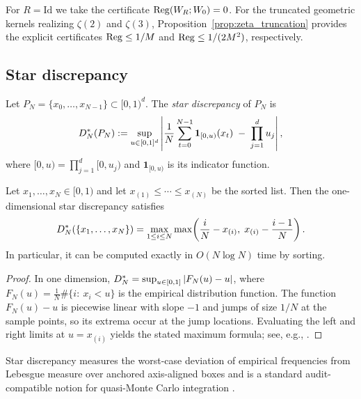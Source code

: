 \begin{remark}
For $R=\mathrm{Id}$ we take the certificate $\mathrm{Reg}(W_R;W_0)=0$.
For the truncated geometric kernels realizing $\zeta(2)$ and $\zeta(3)$, Proposition~\ref{prop:zeta_truncation} provides the explicit certificates $\mathrm{Reg}\le 1/M$ and $\mathrm{Reg}\le 1/(2M^2)$, respectively.
\end{remark}

\subsection{Star discrepancy}
\label{sec:star_discrepancy}

\begin{definition}
\label{def:star_discrepancy}
Let $P_N=\{x_0,\dots,x_{N-1}\}\subset[0,1)^d$.
The \emph{star discrepancy} of $P_N$ is
\[
D_N^\ast(P_N):=\sup_{u\in[0,1]^d}\left|
\frac{1}{N}\sum_{t=0}^{N-1}\mathbf{1}_{[0,u)}(x_t)\;-\;\prod_{j=1}^d u_j
\right|,
\]
where $[0,u)=\prod_{j=1}^d[0,u_j)$ and $\mathbf{1}_{[0,u)}$ is its indicator function.
\end{definition}

\begin{lemma}
\label{lem:star_discrepancy_1d_formula}
Let $x_1,\dots,x_N\in[0,1)$ and let $x_{(1)}\le \cdots \le x_{(N)}$ be the sorted list.
Then the one-dimensional star discrepancy satisfies
\[
D_N^\ast(\{x_1,\dots,x_N\})
=
\max_{1\le i\le N}\max\!\left(\frac{i}{N}-x_{(i)},\;x_{(i)}-\frac{i-1}{N}\right).
\]
In particular, it can be computed exactly in $O(N\log N)$ time by sorting.
\end{lemma}

\begin{proof}
In one dimension, $D_N^\ast=\sup_{u\in[0,1]}|F_N(u)-u|$, where $F_N(u)=\frac{1}{N}\#\{i:\ x_i<u\}$ is the empirical distribution function.
The function $F_N(u)-u$ is piecewise linear with slope $-1$ and jumps of size $1/N$ at the sample points, so its extrema occur at the jump locations.
Evaluating the left and right limits at $u=x_{(i)}$ yields the stated maximum formula; see, e.g., \cite[\S 2.1]{KuipersNiederreiter1974}.
\end{proof}

Star discrepancy measures the worst-case deviation of empirical frequencies from Lebesgue measure over anchored axis-aligned boxes and is a standard audit-compatible notion for quasi-Monte Carlo integration \cite{KuipersNiederreiter1974,Niederreiter1992,Matousek1999}.


